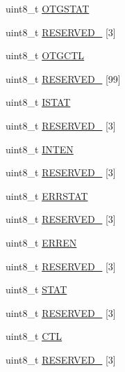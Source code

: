 \begin{DoxyCompactItemize}
\item 
uint8\+\_\+t \hyperlink{struct_u_s_b___mem_map_a2100eaae4e423ee246bbbac4568423eb}{O\+T\+G\+S\+T\+AT}
\item 
uint8\+\_\+t \hyperlink{struct_u_s_b___mem_map_ae0b71ab9559e72dc3679ec091756e67b}{R\+E\+S\+E\+R\+V\+E\+D\+\_} \mbox{[}3\mbox{]}
\item 
uint8\+\_\+t \hyperlink{struct_u_s_b___mem_map_a568c7325541772f0455c8bc732e10a61}{O\+T\+G\+C\+TL}
\item 
uint8\+\_\+t \hyperlink{struct_u_s_b___mem_map_aeb2dfc39c8b07c9be26576a181da1af4}{R\+E\+S\+E\+R\+V\+E\+D\+\_} \mbox{[}99\mbox{]}
\item 
uint8\+\_\+t \hyperlink{struct_u_s_b___mem_map_a1f5db2936f79213669c994319c80201b}{I\+S\+T\+AT}
\item 
uint8\+\_\+t \hyperlink{struct_u_s_b___mem_map_a5876421d4a610aa1ec8c55142a7d131f}{R\+E\+S\+E\+R\+V\+E\+D\+\_} \mbox{[}3\mbox{]}
\item 
uint8\+\_\+t \hyperlink{struct_u_s_b___mem_map_af6cfd1621bc7540fb4f1a7f73a98377f}{I\+N\+T\+EN}
\item 
uint8\+\_\+t \hyperlink{struct_u_s_b___mem_map_ae729f0fe5f746293938b5fe9cf4006fa}{R\+E\+S\+E\+R\+V\+E\+D\+\_} \mbox{[}3\mbox{]}
\item 
uint8\+\_\+t \hyperlink{struct_u_s_b___mem_map_a6c5912b64c4f9c6ea6bc484cfa4aeb46}{E\+R\+R\+S\+T\+AT}
\item 
uint8\+\_\+t \hyperlink{struct_u_s_b___mem_map_a0db623c4034ae906a2590d0ad4b9dcc9}{R\+E\+S\+E\+R\+V\+E\+D\+\_} \mbox{[}3\mbox{]}
\item 
uint8\+\_\+t \hyperlink{struct_u_s_b___mem_map_aeb7e65b1b97a537240956a7f7b1a99bf}{E\+R\+R\+EN}
\item 
uint8\+\_\+t \hyperlink{struct_u_s_b___mem_map_ade5b57b27f61c17492288127d23b8586}{R\+E\+S\+E\+R\+V\+E\+D\+\_} \mbox{[}3\mbox{]}
\item 
uint8\+\_\+t \hyperlink{struct_u_s_b___mem_map_a29552ccb0992dbc97b7cf8259c0c43fe}{S\+T\+AT}
\item 
uint8\+\_\+t \hyperlink{struct_u_s_b___mem_map_a8bcfbb17f5c9418441c1998b58fe61bf}{R\+E\+S\+E\+R\+V\+E\+D\+\_} \mbox{[}3\mbox{]}
\item 
uint8\+\_\+t \hyperlink{struct_u_s_b___mem_map_ad138b7e78dbe9f8cfa0992fbcf3a4fe6}{C\+TL}
\item 
uint8\+\_\+t \hyperlink{struct_u_s_b___mem_map_a92854cf727a032a192888fd92932deec}{R\+E\+S\+E\+R\+V\+E\+D\+\_} \mbox{[}3\mbox{]}
\item 

\end{DoxyCompactItemize}
